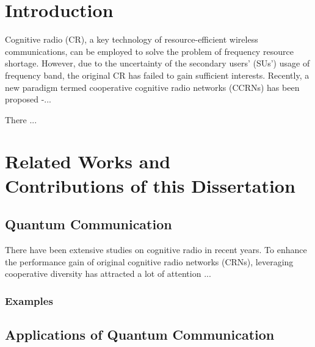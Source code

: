 \documentclass[master,english,final]{kaist-ucs}
\begin{document}
	\tableofcontents

	\listoftables

	\listoffigures



	\chapter{Introduction}
	\noindent
	Cognitive radio (CR), a key technology of resource-efficient wireless communications, can be employed to solve the problem of frequency resource shortage. However, due to the uncertainty of the secondary users' (SUs') usage of frequency band, the original CR has failed to gain sufficient interests. Recently, a new paradigm termed cooperative cognitive radio networks (CCRNs) has been proposed \cite{FD1}-\cite{ML1}...

	There ...

	\chapter[Related Works and Contributions of this Dissertation]{Related Works and \\ Contributions of this Dissertation}

	\section{Quantum Communication}

	There have been extensive studies on cognitive radio in recent years. To enhance the performance gain of original cognitive radio networks (CRNs), leveraging cooperative diversity has attracted a lot of attention \cite{SOCA1}...

	\subsection{Examples}


	\section{Applications of Quantum Communication}
\end{document}

